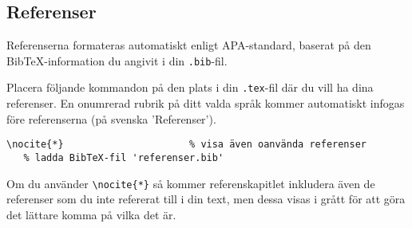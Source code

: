 


\subsection{Referenser}

Referenserna formateras automatiskt enligt APA-standard, baserat på den
BibTeX-information du angivit i din \verb|.bib|-fil.

Placera följande kommandon på den plats i din \verb|.tex|-fil där du vill ha
dina referenser. En onumrerad rubrik på ditt valda språk kommer automatiskt
infogas före referenserna (på svenska 'Referenser').

\begin{verbatim}
\nocite{*}                      % visa även oanvända referenser
   % ladda BibTeX-fil 'referenser.bib'
\end{verbatim}

Om du använder \verb|\nocite{*}| så kommer referenskapitlet inkludera även de
referenser som du inte refererat till i din text, men dessa visas i grått för
att göra det lättare komma på vilka det är.

